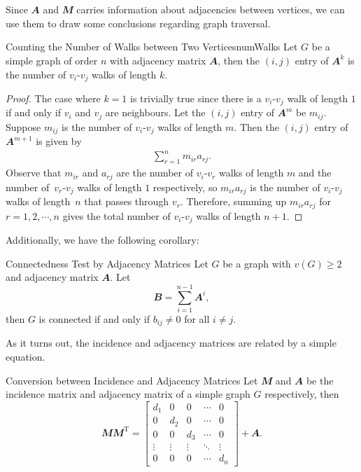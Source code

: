 \documentclass[math]{amznotes}
\theoremstyle{remark}
\begin{document}
\\\\
Since $\mathbfit{A}$ and $\mathbfit{M}$ carries information about adjacencies between vertices, we can use them to draw some conclusions regarding graph traversal.
\begin{probox}{Counting the Number of Walks between Two Vertices}{numWalks}
    Let $G$ be a simple graph of order $n$ with adjacency matrix $\mathbfit{A}$, then the $(i, j)$ entry of $\mathbfit{A}^k$ is the number of $v_i$-$v_j$ walks of length $k$.
    \tcblower   
    \begin{proof}
        The case where $k = 1$ is trivially true since there is a $v_i$-$v_j$ walk of length $1$ if and only if $v_i$ and $v_j$ are neighbours. Let the $(i, j)$ entry of $\mathbfit{A}^m$ be $m_{ij}$. Suppose $m_{ij}$ is the number of $v_i$-$v_j$ walks of length $m$. Then the $(i, j)$ entry of $\mathbfit{A}^{m + 1}$ is given by
        \begin{align*}
            \sum_{r = 1}^{n}m_{ir}a_{rj}.
        \end{align*}
        Observe that $m_{ir}$ and $a_{rj}$ are the number of $v_i$-$v_r$ walks of length $m$ and the number of~$v_r$-$v_j$ walks of length $1$ respectively, so $m_{ir}a_{rj}$ is the number of $v_i$-$v_j$ walks of length~$n$ that passes through $v_r$. Therefore, summing up $m_{ir}a_{rj}$ for $r = 1, 2, \cdots, n$ gives the total number of $v_i$-$v_j$ walks of length $n + 1$.
    \end{proof}
\end{probox}
Additionally, we have the following corollary:
\begin{corbox}{Connectedness Test by Adjacency Matrices}{}
    Let $G$ be a graph with $v(G) \geq 2$ and adjacency matrix $\mathbfit{A}$. Let
    \begin{equation*}
        \mathbfit{B} = \sum_{i = 1}^{n - 1}\mathbfit{A}^i,
    \end{equation*}
    then $G$ is connected if and only if $b_{ij} \neq 0$ for all $i \neq j$.
\end{corbox}
As it turns out, the incidence and adjacency matrices are related by a simple equation.
\begin{probox}{Conversion between Incidence and Adjacency Matrices}{}
    Let $\mathbfit{M}$ and $\mathbfit{A}$ be the incidence matrix and adjacency matrix of a simple graph $G$ respectively, then
    \begin{equation*}
        \mathbfit{M}\mathbfit{M}^{\mathrm{T}} = \begin{bmatrix}
            d_1 & 0 & 0 & \cdots & 0 \\
            0 & d_2 & 0 & \cdots & 0 \\
            0 & 0 & d_3 & \cdots & 0 \\
            \vdots & \vdots & \vdots & \ddots & \vdots \\
            0 & 0 & 0 & \cdots & d_n
        \end{bmatrix} + \mathbfit{A}.
    \end{equation*}
\end{probox}
\end{document}
